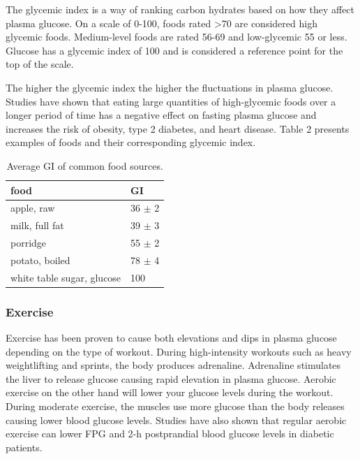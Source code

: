 \documentclass[english, 12pt, a4paper, elec, utf8, a-1b, online]{aaltothesis}
\begin{document}
The glycemic index is a way of ranking carbon hydrates based on how they affect plasma glucose.
On a scale of 0-100, foods rated >70 are considered high glycemic foods. Medium-level foods
are rated 56-69 and low-glycemic 55 or less\cite{atkinson_gi}. Glucose has a glycemic index of 
100 and is considered a reference point for the top of the scale.

The higher the glycemic index the higher the fluctuations in plasma glucose\cite{pi-sunyer_glycemic_2002}. Studies have 
shown that eating large quantities of high-glycemic foods over a longer period of time 
has a negative effect on fasting plasma glucose and increases the risk of obesity, type 
2 diabetes, and heart disease\cite{pi-sunyer_glycemic_2002}. Table 2 presents examples of foods and their corresponding 
glycemic index.

\begin{table}[H]
\begin{center}
\begin{tabular}{ | m{5cm} | m{2cm} | }
    \hline
    \textbf{food} & \textbf{GI} \\ 
    \hline
    apple, raw & 36 $\pm$ 2\\
    milk, full fat & 39 $\pm$ 3 \\
    porridge & 55 $\pm$ 2 \\
    potato, boiled & 78 $\pm$ 4 \\
    white table sugar, glucose & 100 \\
    \hline
\end{tabular}
\caption{Average GI of common food sources\cite{gi_indexes}.}
\end{center}
\end{table}

\subsubsection{Exercise}
Exercise has been proven to cause both elevations and dips in plasma glucose depending on
the type of workout. During high-intensity workouts such as heavy weightlifting and sprints, 
the body produces adrenaline. 
Adrenaline stimulates the liver to release glucose causing 
rapid elevation in plasma glucose\cite{excersise_glucose}. Aerobic exercise on the other hand
will lower your glucose levels during the workout. During moderate exercise, the muscles use more glucose than the body releases causing 
lower blood glucose levels.
Studies have also shown that regular aerobic 
exercise can lower FPG and 2-h postprandial blood glucose levels in diabetic patients\cite{shahgholian_effects_2015}.  
\end{document}
